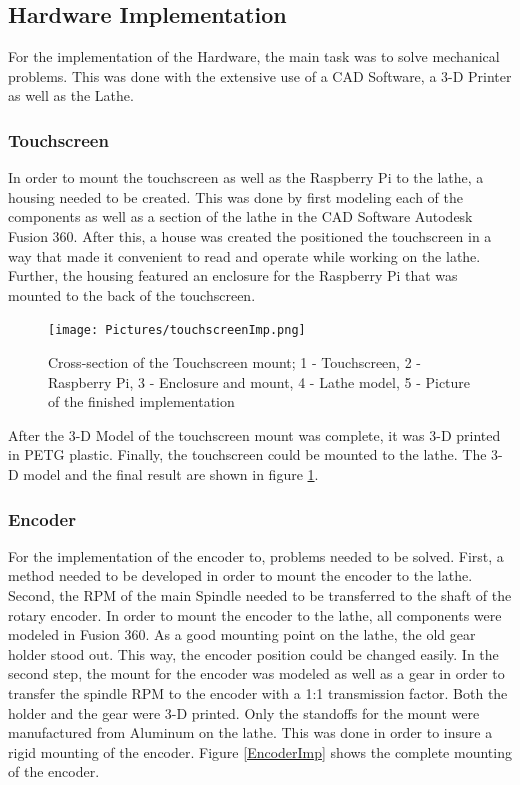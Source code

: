 \subsection{Hardware Implementation}
For the implementation of the Hardware, the main task was to solve mechanical problems. This was done with the extensive use of a CAD Software, a 3-D Printer as well as the Lathe.
 
\subsubsection{Touchscreen}
In order to mount the touchscreen as well as the Raspberry Pi to the lathe, a housing needed to be created. This was done by first modeling each of the components as well as a section of the lathe in the CAD Software Autodesk Fusion 360. After this, a house was created the positioned the touchscreen in a way that made it convenient to read and operate while working on the lathe. Further, the housing featured an enclosure for the Raspberry Pi that was mounted to the back of the touchscreen.
 
\begin{figure}
    \begin{center}
    \texttt{[image: Pictures/touchscreenImp.png]}
    \caption[Cross-section of the Touchscreen mount]{Cross-section of the Touchscreen mount; 1 - Touchscreen, 2 - Raspberry Pi, 3 - Enclosure and mount, 4 - Lathe model, 5 - Picture of the finished implementation}
    \label{touchscreenImp}
    \end{center}
\end{figure}
 
After the 3-D Model of the touchscreen mount was complete, it was 3-D printed in PETG plastic. Finally, the touchscreen could be mounted to the lathe. The 3-D model and the final result are shown in figure \ref{touchscreenImp}.
 
\subsubsection{Encoder}
For the implementation of the encoder to, problems needed to be solved. First, a method needed to be developed in order to mount the encoder to the lathe. Second, the RPM of the main Spindle needed to be transferred to the shaft of the rotary encoder.
In order to mount the encoder to the lathe, all components were modeled in Fusion 360. As a good mounting point on the lathe, the old gear holder stood out. This way, the encoder position could be changed easily. In the second step, the mount for the encoder was modeled as well as a gear in order to transfer the spindle RPM to the encoder with a 1:1 transmission factor. Both the holder and the gear were 3-D printed. Only the standoffs for the mount were manufactured from Aluminum on the lathe. This was done in order to insure a rigid mounting of the encoder. Figure \ref{EncoderImp} shows the complete mounting of the encoder.
 
